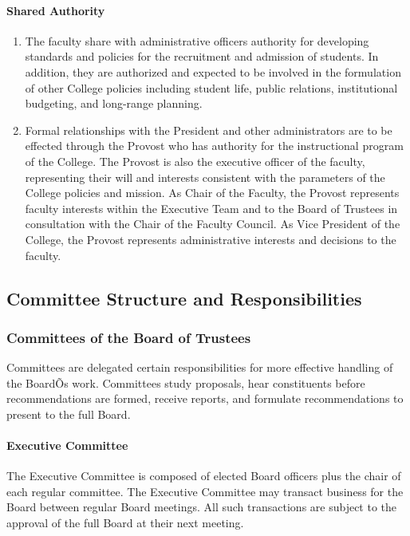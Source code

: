 \documentclass[letterpaper, 11pt]{article}
\begin{document}
			\paragraph{Shared Authority}
				\begin{enumerate}[label=\alph*)]
					\item{ The faculty share with administrative officers authority for developing standards and policies
						for the recruitment and admission of students. In addition, they are authorized and expected to be
						involved in the formulation of other College policies including student life, public relations,
						institutional budgeting, and long-range planning.}
					\item{ Formal relationships with the President and other administrators are to be effected through the
						Provost who has authority for the instructional program of the College.  The Provost is also the
						executive officer of the faculty, representing their will and interests consistent with the
						parameters of the College policies and mission.  As Chair of the Faculty, the Provost represents
						faculty interests within the Executive Team and to the Board of Trustees in consultation with the
						Chair of the Faculty Council.  As Vice President of the College, the Provost represents
						administrative interests and decisions to the faculty.}
				\end{enumerate}
	\subsection{Committee Structure and Responsibilities}
		\subsubsection{Committees of the Board of Trustees}
			Committees are delegated certain responsibilities for more effective handling of the BoardÕs work.  Committees study proposals, hear constituents before recommendations are formed, receive reports, and formulate recommendations to present to the full Board.
			\paragraph{Executive Committee}
				The Executive Committee is composed of elected Board officers plus the chair of each regular committee.  The Executive Committee may transact business for the Board between regular Board meetings.  All such transactions are subject to the approval of the full Board at their next meeting.
\end{document}
